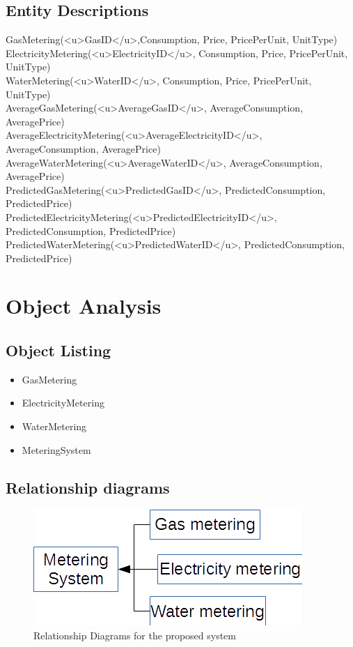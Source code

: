 \subsection{Entity Descriptions}
	GasMetering(<u>GasID</u>,Consumption, Price, PricePerUnit, UnitType)\\
	ElectricityMetering(<u>ElectricityID</u>, Consumption, Price, PricePerUnit, UnitType)\\
	WaterMetering(<u>WaterID</u>, Consumption, Price, PricePerUnit, UnitType)\\
	AverageGasMetering(<u>AverageGasID</u>, AverageConsumption, AveragePrice)\\
	AverageElectricityMetering(<u>AverageElectricityID</u>, AverageConsumption, AveragePrice)\\
	AverageWaterMetering(<u>AverageWaterID</u>, AverageConsumption, AveragePrice)\\
	PredictedGasMetering(<u>PredictedGasID</u>, PredictedConsumption, PredictedPrice)\\
	PredictedElectricityMetering(<u>PredictedElectricityID</u>, PredictedConsumption, PredictedPrice)\\
	PredictedWaterMetering(<u>PredictedWaterID</u>, PredictedConsumption, PredictedPrice)\\
\section{Object Analysis}

\subsection{Object Listing}
\begin{itemize}
	\item GasMetering
	\item ElectricityMetering
	\item WaterMetering
	\item MeteringSystem
\end{itemize}
\subsection{Relationship diagrams}
\begin{figure}[H]
    \includegraphics[width=\textwidth]{./Relationships.png}
    \caption{Relationship Diagrams for the proposed system} \label{fig:Relationship Diagrams}
\end{figure}
